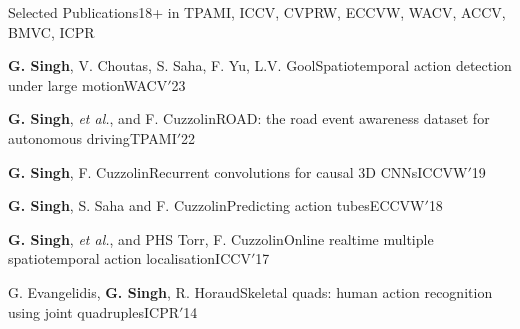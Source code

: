 \documentclass{resume} %
\begin{document}
\vspace{0.1in}
\begin{rSection}{Selected Publications}{18+\footnotesize{ in TPAMI, ICCV, CVPRW, ECCVW, WACV, ACCV, BMVC, ICPR}}
  \begin{pSubsection}{\textbf{G. Singh}, V. Choutas, S. Saha, F. Yu, L.V. Gool}{Spatiotemporal action detection under large motion}{WACV}{$'$23}\end{pSubsection}
  \begin{pSubsection}{\textbf{G. Singh}, \textit{et al.}, and
    F. Cuzzolin}{ROAD: the road event awareness dataset for autonomous driving}{TPAMI}{$'$22}\end{pSubsection}
  \begin{pSubsection}{\textbf{G. Singh}, F. Cuzzolin}{Recurrent convolutions for causal 3D CNNs}{ICCVW}{$'$19}\end{pSubsection}
  \begin{pSubsection}{\textbf{G. Singh}, S. Saha and F. Cuzzolin}{Predicting action tubes}{ECCVW}{$'$18}\end{pSubsection}
  \begin{pSubsection}{\textbf{G. Singh}, \textit{et al.}, and PHS Torr, F. Cuzzolin}{Online realtime multiple spatiotemporal action localisation}{ICCV}{$'$17}\end{pSubsection}
  \begin{pSubsection}{G. Evangelidis, \textbf{G. Singh}, R. Horaud}{Skeletal quads: human action recognition using joint quadruples}{ICPR}{$'$14}\end{pSubsection}
  
  \end{rSection}
\end{document}
